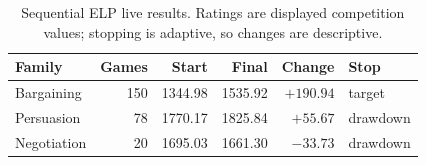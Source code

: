 \begin{table}[t]
  \caption{Sequential ELP live results. Ratings are displayed competition
  values; stopping is adaptive, so changes are descriptive.}
  \label{tab:v33-results}
  \centering
  \small
  \begin{tabular}{lrrrrl}
    \toprule
    Family & Games & Start & Final & Change & Stop \\
    \midrule
    Bargaining & 150 & 1344.98 & 1535.92 & $+190.94$ & target \\
    Persuasion & 78 & 1770.17 & 1825.84 & $+55.67$ & drawdown \\
    Negotiation & 20 & 1695.03 & 1661.30 & $-33.73$ & drawdown \\
    \bottomrule
  \end{tabular}
\end{table}
